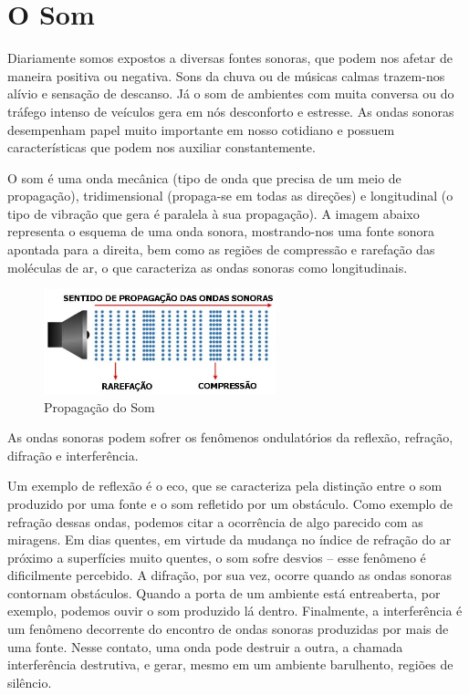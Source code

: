 \section{O Som}
Diariamente somos expostos a diversas fontes sonoras, que podem nos afetar de maneira positiva ou negativa. Sons da chuva ou de músicas calmas trazem-nos alívio e sensação de descanso. Já o som de ambientes com muita conversa ou do tráfego intenso de veículos gera em nós desconforto e estresse. As ondas sonoras desempenham papel muito importante em nosso cotidiano e possuem características que podem nos auxiliar constantemente.

O som é uma onda mecânica (tipo de onda que precisa de um meio de propagação), tridimensional (propaga-se em todas as direções) e longitudinal (o tipo de vibração que gera é paralela à sua propagação). A imagem abaixo representa o esquema de uma onda sonora, mostrando-nos uma fonte sonora apontada para a direita, bem como as regiões de compressão e rarefação das moléculas de ar, o que caracteriza as ondas sonoras como longitudinais.

\begin{figure}[hb]
    \centering
    \includegraphics[width=0.6\textwidth]{imgs/propagacao_som.png}
    \caption{Propagação do Som}
    \label{fig:my_labeel}
\end{figure}

As ondas sonoras podem sofrer os fenômenos ondulatórios da reflexão, refração, difração e interferência.

Um exemplo de reflexão é o eco, que se caracteriza pela distinção entre o som produzido por uma fonte e o som refletido por um obstáculo. Como exemplo de refração dessas ondas, podemos citar a ocorrência de algo parecido com as miragens. Em dias quentes, em virtude da mudança no índice de refração do ar próximo a superfícies muito quentes, o som sofre desvios – esse fenômeno é dificilmente percebido. A difração, por sua vez, ocorre quando as ondas sonoras contornam obstáculos. Quando a porta de um ambiente está entreaberta, por exemplo, podemos ouvir o som produzido lá dentro. Finalmente, a interferência é um fenômeno decorrente do encontro de ondas sonoras produzidas por mais de uma fonte. Nesse contato, uma onda pode destruir a outra, a chamada interferência destrutiva, e gerar, mesmo em um ambiente barulhento, regiões de silêncio.

